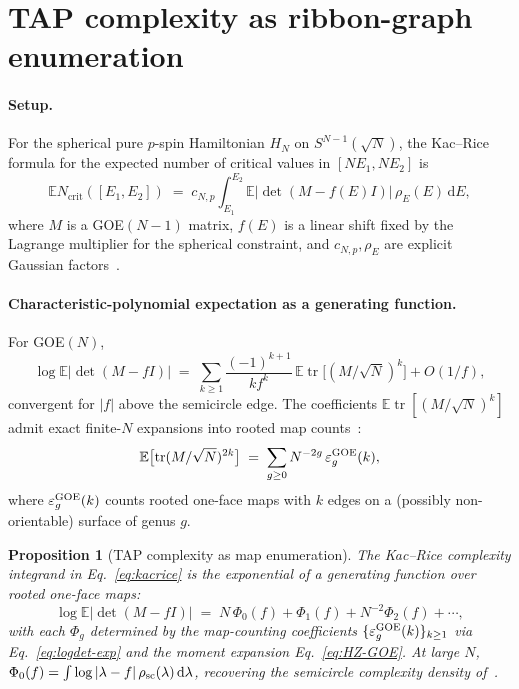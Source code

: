 \documentclass[10pt,a4paper,twocolumn]{article}
\theoremstyle{plain}
\newtheorem{proposition}[theorem]{Proposition}
\theoremstyle{definition}
\newcommand{\dd}{\mathrm{d}}
\newcommand{\Tr}{\operatorname{tr}}
\newcommand{\Ex}{\mathbb{E}}
\begin{document}
\section{TAP complexity as ribbon-graph enumeration}
\label{sec:tap}

\paragraph{Setup.}  For the spherical pure $p$-spin Hamiltonian
$H_N$ on $S^{N-1}(\sqrt{N})$, the Kac--Rice formula for the expected
number of critical values in $[NE_1, NE_2]$ is
\begin{equation}
  \Ex N_{\text{crit}}([E_1, E_2])
  \;=\; c_{N,p} \int_{E_1}^{E_2}
    \Ex \bigl|\det(M - f(E) I)\bigr| \, \rho_E(E) \, \dd E,
  \label{eq:kacrice}
\end{equation}
where $M$ is a GOE$(N{-}1)$ matrix, $f(E)$ is a linear shift
fixed by the Lagrange multiplier for the spherical constraint, and
$c_{N,p}, \rho_E$ are explicit Gaussian factors~\citep{ABAC2013,Subag2017}.

\paragraph{Characteristic-polynomial expectation as a generating
function.}
For GOE$(N)$,
\begin{equation}
  \log \Ex \bigl|\det(M - fI)\bigr|
  \;=\; \sum_{k \geq 1} \frac{(-1)^{k+1}}{k f^k}\,
        \Ex \Tr \bigl[(M/\sqrt{N})^k\bigr]
        + O(1/f),
  \label{eq:logdet-exp}
\end{equation}
convergent for $|f|$ above the semicircle edge.  The coefficients
$\Ex\Tr[(M/\sqrt{N})^k]$ admit exact finite-$N$ expansions into
rooted map counts~\citep{HarerZagier1986,GouldenJackson1997}:
\begin{equation}
  \Ex \bigl[\Tr (M/\sqrt{N})^{2k}\bigr]
  \;=\; \sum_{g \geq 0} N^{-2g}\, \varepsilon^{\rm GOE}_g(k),
  \label{eq:HZ-GOE}
\end{equation}
where $\varepsilon^{\rm GOE}_g(k)$ counts rooted one-face maps with
$k$ edges on a (possibly non-orientable) surface of genus $g$.

\begin{proposition}[TAP complexity as map enumeration]
\label{prop:tap}
The Kac--Rice complexity integrand in Eq.~\eqref{eq:kacrice} is the
exponential of a generating function over rooted one-face maps:
\begin{equation}
  \log \Ex \bigl|\det(M - fI)\bigr|
  \;=\; N \, \Phi_0(f) + \Phi_1(f) + N^{-2}\Phi_2(f) + \cdots,
\end{equation}
with each $\Phi_g$ determined by the map-counting coefficients
$\{\varepsilon^{\rm GOE}_g(k)\}_{k \geq 1}$ via
Eq.~\eqref{eq:logdet-exp} and the moment expansion
Eq.~\eqref{eq:HZ-GOE}.  At large $N$, $\Phi_0(f) = \int \log|\lambda -
f|\,\rho_{\rm sc}(\lambda)\,\dd\lambda$, recovering the semicircle
complexity density of~\citep{ABAC2013}.
\end{proposition}
\end{document}
